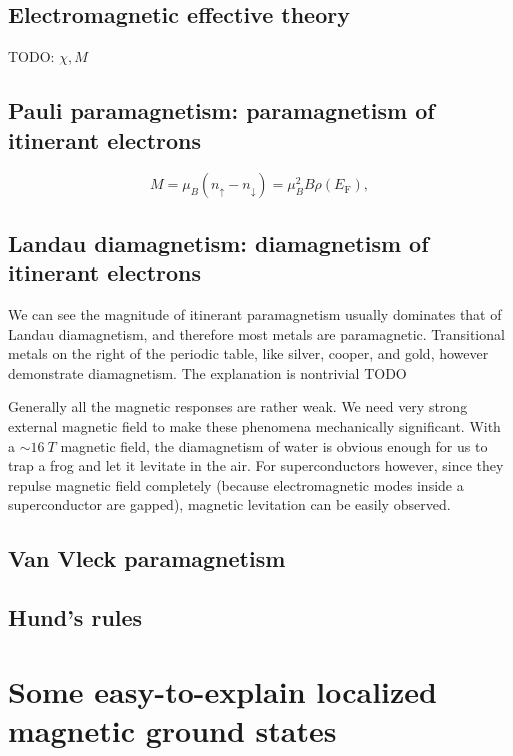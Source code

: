 \documentclass[hyperref, a4paper]{article}
\newcommand*{\efermi}{E_{\text{F}}}
\begin{document}
\subsection{Electromagnetic effective theory}

TODO: $\chi, M$

\subsection{Pauli paramagnetism: paramagnetism of itinerant electrons}

\begin{equation}
    M = \mu_{B} (n_\uparrow - n_\downarrow) = \mu_B^2 B \rho(\efermi),
\end{equation}

\subsection{Landau diamagnetism: diamagnetism of itinerant electrons}

We can see the magnitude of itinerant paramagnetism usually dominates that of Landau diamagnetism,
and therefore most metals are paramagnetic. 
Transitional metals on the right of the periodic table, like silver, cooper, and gold,
however demonstrate diamagnetism.
The explanation is nontrivial TODO

Generally all the magnetic responses are rather weak. 
We need very strong external magnetic field 
to make these phenomena mechanically significant.
With a $\sim \SI{16}{T}$ magnetic field,
the diamagnetism of water is obvious enough 
for us to trap a frog and let it levitate in the air.
For superconductors however, 
since they repulse magnetic field completely
(because electromagnetic modes inside a superconductor are gapped),
magnetic levitation can be easily observed.

\subsection{Van Vleck paramagnetism}

\subsection{Hund's rules}



\section{Some easy-to-explain localized magnetic ground states}
\end{document}
